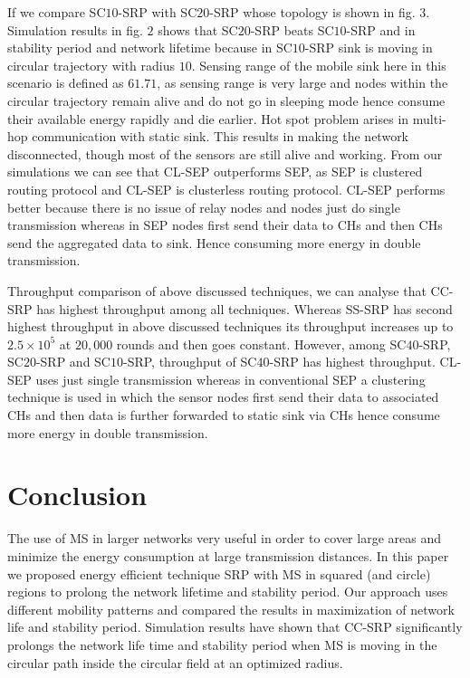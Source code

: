 \documentclass{article}
\begin{document}
If we compare SC$10$-SRP with SC$20$-SRP whose topology is shown in fig. $3$. Simulation results in fig. $2$ shows that SC$20$-SRP beats SC$10$-SRP and in stability period and network lifetime because in SC$10$-SRP sink is moving in circular trajectory with radius $10$. Sensing range of the mobile sink here in this scenario is defined as $61.71$, as sensing range is very large and nodes within the circular trajectory remain alive and do not go in sleeping mode hence consume their available energy rapidly and die earlier.
Hot spot problem arises in multi-hop communication with static sink. This results in making the network disconnected, though most of the sensors are still alive and working. From our simulations we can see that CL-SEP outperforms SEP, as SEP is clustered routing protocol and CL-SEP is clusterless routing protocol. CL-SEP performs better because there is no issue of relay nodes and nodes just do single transmission whereas in SEP nodes first send their data to CHs and then CHs send the aggregated data to sink. Hence consuming more energy in double transmission.


Throughput comparison of above discussed techniques, we can analyse that CC-SRP has highest throughput among all techniques.
Whereas SS-SRP has second highest throughput in above discussed techniques its throughput increases up to $2.5\times10^5$ at $20,000$ rounds and then goes constant. However, among SC$40$-SRP, SC$20$-SRP and SC$10$-SRP, throughput of SC$40$-SRP has highest throughput.
CL-SEP uses just single transmission whereas in conventional SEP a clustering technique is used in which the sensor nodes first send their data to associated CHs and then data is further forwarded to static sink via CHs hence consume more energy in double transmission.

\vspace{-.7cm}
\section{Conclusion}
\vspace{-.5cm}
\label{sec:majhead}

The use of MS in larger networks very useful in order to cover large areas and minimize the energy consumption at large transmission distances. In this paper we proposed energy efficient technique SRP with MS in squared (and circle) regions to prolong the network lifetime and stability period. Our approach uses different mobility patterns and compared the results in maximization of network life and stability period. Simulation results have shown that CC-SRP significantly prolongs the network life time and stability period when MS is moving in the circular path inside the circular field at an optimized radius.
\end{document}
